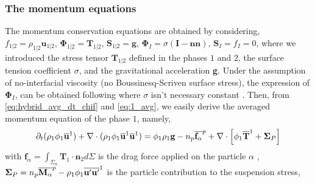 \subsubsection{The momentum equations}
The momentum conservation equations are obtained by considering, 
$f_{1|2} = \rho_{1|2} \textbf{u}_{1|2}$,           
$\mathbf{\Phi}_{1|2} = \textbf{T}_{1|2}$,
$\textbf{S}_{1|2} = \textbf{g}$, 
$\mathbf{\Phi}_I  =  \sigma (\textbf{I} - \textbf{nn})$,
$\mathbf{S}_I  =  f_I = 0$,
where we introduced the stress tensor $\textbf{T}_{1|2}$   defined in the phases $1$ and $2$, the surface tension coefficient $\sigma$, and the gravitational acceleration \textbf{g}.
Under the assumption of no-interfacial viscosity (no Boussinesq-Scriven surface stress), the expression of $\mathbf{\Phi}_I$, can be obtained following \citet[Chapter 2]{tryggvason2011direct}\citet{brenner2013interfacial} where $\sigma$ isn't necessary constant .  
Then, from \ref{eq:hybrid_avg_dt_chif} and \ref{eq:1_avg}, we easily derive the averaged momentum  equation of the phase $1$, namely, 
\begin{equation}
    \partial_t (\rho_1\phi_1\overline{\textbf{u}}^1)
    +  \mathbf{\nabla} \cdot (\rho_1\phi_1\overline{\textbf{u}}^1 \overline{\textbf{u}}^1)
    = 
     \phi_1 \rho_1 \textbf{g}
    - n_p\overline{\textbf{f}_\alpha}^{p}
    +  \mathbf{\nabla} \cdot \left[
        \phi_1\overline{ \textbf{T}}^1
        + \mathbf{\Sigma}_P
    \right]
    \label{eq:hybrid_avg_dt_rhou}
\end{equation}
with $\textbf{f}_\alpha = \int_{\Sigma_\alpha} \mathbf{T}_1 \cdot \textbf{n}_2d\Sigma$ is the drag force applied on the particle $\alpha$ ,
$\mathbf{\Sigma}_P = n_p\overline{\textbf{M}_\alpha}^{p} -  \rho_1\phi_1\overline{\textbf{u}'\textbf{u}'}^1$ is the particle contribution to the suspension stress,
